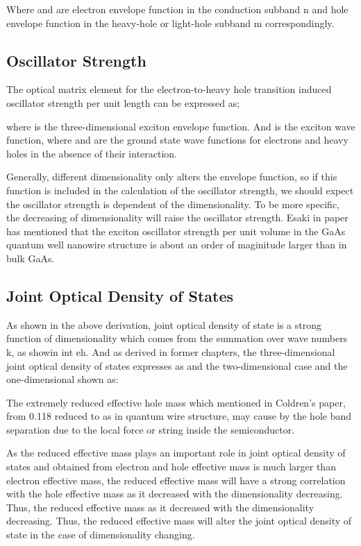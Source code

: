 Where and are electron envelope function in the conduction subband n and hole
envelope function in the heavy-hole or light-hole subband m correspondingly.

\subsection{Oscillator Strength}

The optical matrix element for the electron-to-heavy hole transition induced oscillator strength per unit length can be expressed as;

where is the three-dimensional exciton envelope function. And is the exciton
wave function, where and are the ground state wave functions for electrons and
heavy holes in the absence of their interaction.

Generally, different dimensionality only alters the envelope function, so if
this function is included in the calculation of the oscillator strength, we
should expect the oscillator strength is dependent of the dimensionality. To be
more specific, the decreasing of dimensionality will raise the oscillator
strength. Esaki in paper has mentioned that the exciton oscillator strength per
unit volume in the GaAs quantum well nanowire structure is about an order of
maginitude larger than in bulk GaAs.

\subsection{Joint Optical Density of States}

As shown in the above derivation, joint optical density of state is a strong function of dimensionality which comes from the summation over wave numbers k, as showin int eh. And as derived in former chapters, the three-dimensional joint optical density of states expresses as
and the two-dimensional case and the one-dimensional shown as:

The extremely reduced effective hole mass which mentioned in Coldren's paper, from 0.118 reduced to as in quantum wire structure, may cause by the hole band separation due to the local force or string inside the semiconductor.

As the reduced effective mass plays an important role in joint optical density
of states and obtained from electron and hole effective mass is much larger
than electron effective mass, the reduced effective mass will have a strong
correlation with the hole effective mass as it decreased with the
dimensionality decreasing. Thus, the reduced effective mass as it decreased
with the dimensionality decreasing. Thus, the reduced effective mass will alter
the joint optical density of state in the case of dimensionality changing.

